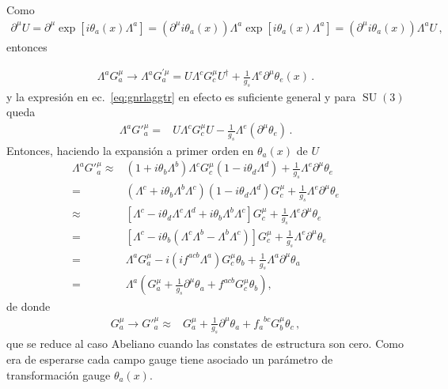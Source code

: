 Como
\begin{align}
  \partial^{\mu}U= \partial^{\mu}\exp\left[i\theta_a(x){\Lambda^a}\right]
  = \left( \partial^{\mu}i\theta_a(x)\right){\Lambda^a}\exp\left[i\theta_a(x){\Lambda^a}\right]
   = \left( \partial^{\mu}i\theta_a(x)\right){\Lambda^a}U\,,
\end{align}
entonces
\begin{frame}
\begin{align}
 \Lambda^a{G}^\mu_a\to\Lambda^a{G}^{\prime \mu}_a=U\Lambda^c{G}^\mu_c U^{\dagger}+\frac{1}{g_s}{\Lambda^e} \partial^{\mu}\theta_e(x)\,.
\end{align}
y la expresión en ec.~\eqref{eq:gnrlaggtr} en efecto es suficiente general y para $\operatorname{SU}(3)$ queda
\begin{align}
   \Lambda^a{G'}^\mu_a=&U\Lambda^cG^\mu_cU-\frac{1}{g_s}\Lambda^e(\partial^\mu\theta_e)\,.
\end{align}
Entonces, haciendo la expansión a primer orden en $\theta_{a}(x)$ de $U$
\begin{align}
\label{eq:Gmuinv}
  \Lambda^a{G'}^\mu_a\approx&(1+i\theta_b\Lambda^b)\Lambda^cG^\mu_c(1-i\theta_d\Lambda^d)+\frac{1}{g_s}\Lambda^e\partial^\mu\theta_e\nonumber\\
  =&(\Lambda^c+i\theta_b\Lambda^b\Lambda^c)(1-i\theta_d\Lambda^d)G^\mu_c+\frac{1}{g_s}\Lambda^e\partial^\mu\theta_e\nonumber\\
  \approx&[\Lambda^c-i\theta_d\Lambda^c\Lambda^d+i\theta_b\Lambda^b\Lambda^c]G^\mu_c+\frac{1}{g_s}\Lambda^e\partial^\mu\theta_e\nonumber\\
  =&[\Lambda^c-i\theta_b(\Lambda^c\Lambda^b-\Lambda^b\Lambda^c)]G^\mu_c+\frac{1}{g_s}\Lambda^e\partial^\mu\theta_e\nonumber\\
  =&\Lambda^aG^\mu_a-i(i f^{acb}\Lambda^a)G^\mu_c\theta_b+\frac{1}{g_s}\Lambda^a\partial^\mu\theta_a\nonumber\\
  =&\Lambda^a\left(G^\mu_a+\frac{1}{g_s}\partial^\mu\theta_a+f^{acb}G^\mu_c\theta_b\right),
\end{align}
de donde
\begin{align}
  \label{eq:gmutrinf}
  G^\mu_a\to {G'}^\mu_a\approx&G^\mu_a+\frac{1}{g_s}\partial^\mu\theta_a+{f_a}^{bc}G^\mu_b\theta_c\,,
\end{align}
que se reduce al caso Abeliano cuando las constates de estructura son cero. Como era de esperarse cada campo gauge tiene asociado un parámetro de transformación gauge $\theta_a(x)$.
\end{frame}


